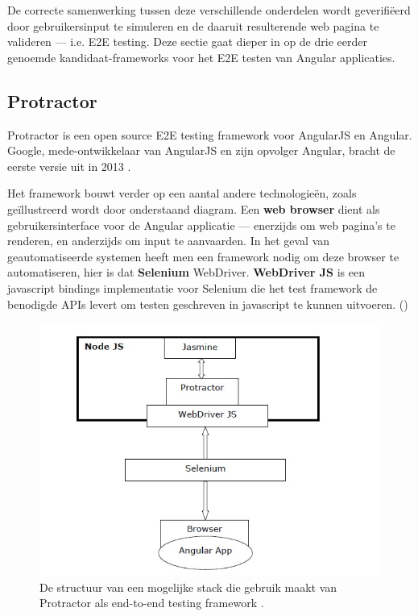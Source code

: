 De correcte samenwerking tussen deze verschillende onderdelen wordt geverifiëerd door gebruikersinput te simuleren en de daaruit resulterende web pagina te valideren — i.e. E2E testing. Deze sectie gaat dieper in op de drie eerder genoemde kandidaat-frameworks voor het E2E testen van Angular applicaties.

\subsection{Protractor}

Protractor is een open source E2E testing framework voor AngularJS en Angular. Google, mede-ontwikkelaar van AngularJS en zijn opvolger Angular, bracht de eerste versie uit in 2013 \autocite{Amorim2014}.

Het framework bouwt verder op een aantal andere technologieën, zoals geïllustreerd wordt door onderstaand diagram. Een \textbf{web browser} dient als gebruikersinterface voor de Angular applicatie — enerzijds om web pagina's te renderen, en anderzijds om input te aanvaarden. In het geval van geautomatiseerde systemen heeft men een framework nodig om deze browser te automatiseren, hier is dat \textbf{Selenium} WebDriver. \textbf{WebDriver JS} is een javascript bindings implementatie voor Selenium die het test framework de benodigde APIs levert om testen geschreven in javascript  te kunnen uitvoeren. (\cite{TutorialspointProtractor2020})

\begin{figure}[h!]
    \centering
    \includegraphics[scale=0.6]{img/TutorialsPointProtractor2020ProtractorDiagram.jpg}
    \caption{De structuur van een mogelijke stack die gebruik maakt van Protractor als end-to-end testing framework \autocite{TutorialspointProtractor2020}.}
    \label{fig:tutorialspointprotractordiagram}
\end{figure}

